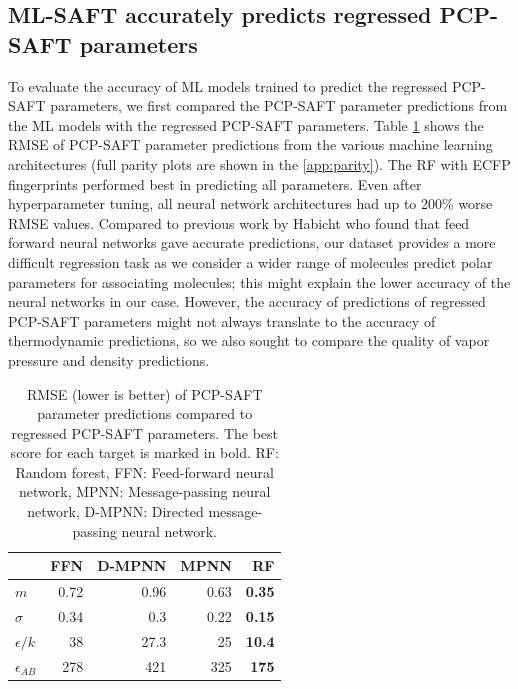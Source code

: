 \subsection{ML-SAFT accurately predicts regressed PCP-SAFT parameters}

To evaluate the accuracy of ML models trained to predict the regressed PCP-SAFT parameters, we first compared the PCP-SAFT parameter predictions from the ML models with the regressed PCP-SAFT parameters. Table \ref{tab:parameter_predictions} shows the RMSE of PCP-SAFT parameter predictions from the various machine learning architectures (full parity plots are shown in the \ref{app:parity}). The RF with ECFP fingerprints performed best in predicting all parameters. Even after hyperparameter tuning, all neural network architectures had up to 200\% worse RMSE values. Compared to previous work by Habicht who found that feed forward neural networks gave accurate predictions, our dataset provides a more difficult regression task as we consider a wider range of molecules predict polar parameters for associating molecules; this might explain the lower accuracy of the neural networks in our case. However, the accuracy of predictions of regressed PCP-SAFT parameters might not always translate to the accuracy of thermodynamic predictions, so we also sought to compare the quality of vapor pressure and density predictions.


\begin{table}
	\caption{RMSE (lower is better) of PCP-SAFT parameter predictions compared to regressed PCP-SAFT parameters. The best score for each target is marked in bold. RF: Random forest, FFN: Feed-forward neural network, MPNN: Message-passing neural network, D-MPNN: Directed message-passing neural network.}
        \label{tab:parameter_predictions}
	\begin{center}
		\begin{tabular}{lrrrr}
			 & FFN & D-MPNN & MPNN & RF \\
			\hline
			$m$ & 0.72 & 0.96 & 0.63 & \textbf{0.35} \\
			$\sigma$ & 0.34 & 0.3 & 0.22 & \textbf{0.15} \\
			$\epsilon/k$ & 38 & 27.3 & 25 & \textbf{10.4} \\
			$\epsilon_{AB}$ & 278 & 421 & 325 & \textbf{175} \\
		\end{tabular}
	\end{center}
\end{table}

